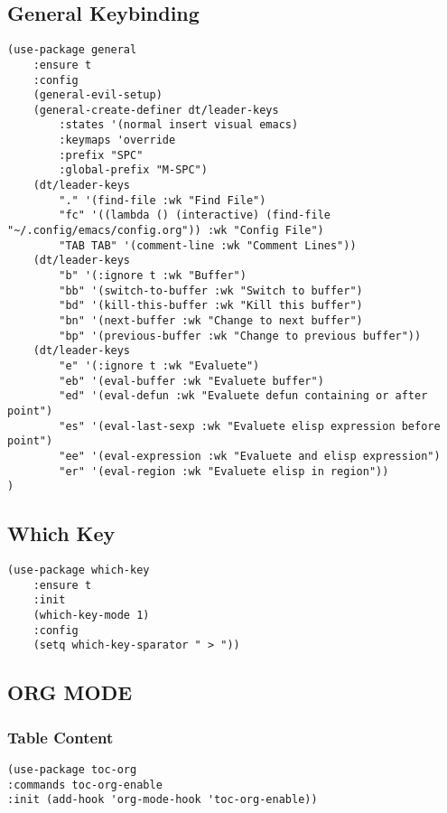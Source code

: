 \documentclass[11pt]{article}
\begin{document}
\subsection{General Keybinding}
\label{sec:org4d5ffd1}
\begin{verbatim}
(use-package general
    :ensure t
    :config
	(general-evil-setup)
	(general-create-definer dt/leader-keys
	    :states '(normal insert visual emacs)
	    :keymaps 'override
	    :prefix "SPC"
	    :global-prefix "M-SPC")
	(dt/leader-keys
	    "." '(find-file :wk "Find File")
	    "fc" '((lambda () (interactive) (find-file "~/.config/emacs/config.org")) :wk "Config File")
	    "TAB TAB" '(comment-line :wk "Comment Lines"))
	(dt/leader-keys
	    "b" '(:ignore t :wk "Buffer")
	    "bb" '(switch-to-buffer :wk "Switch to buffer")
	    "bd" '(kill-this-buffer :wk "Kill this buffer")
	    "bn" '(next-buffer :wk "Change to next buffer")
	    "bp" '(previous-buffer :wk "Change to previous buffer"))
	(dt/leader-keys
	    "e" '(:ignore t :wk "Evaluete")
	    "eb" '(eval-buffer :wk "Evaluete buffer")
	    "ed" '(eval-defun :wk "Evaluete defun containing or after point")
	    "es" '(eval-last-sexp :wk "Evaluete elisp expression before point")
	    "ee" '(eval-expression :wk "Evaluete and elisp expression")
	    "er" '(eval-region :wk "Evaluete elisp in region"))
)
\end{verbatim}

\subsection{Which Key}
\label{sec:orgd52d352}
\begin{verbatim}
(use-package which-key 
    :ensure t
    :init
	(which-key-mode 1)
    :config
	(setq which-key-sparator " > "))
\end{verbatim}

\subsection{ORG MODE}
\label{sec:org7b78b4a}

\subsubsection{Table Content}
\label{sec:orgc9e0ee5}
\begin{verbatim}
(use-package toc-org
:commands toc-org-enable
:init (add-hook 'org-mode-hook 'toc-org-enable))
\end{verbatim}
\end{document}
